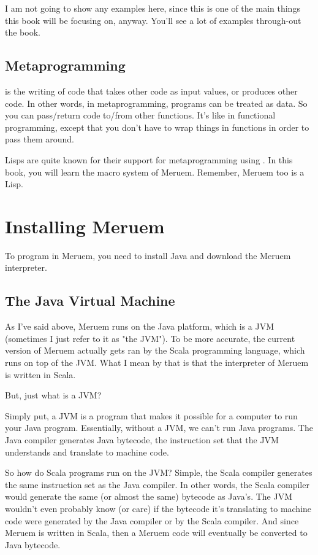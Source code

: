 I am not going to show any examples here, since this is one of the main things this book will be focusing on, anyway. You'll see a lot of examples through-out the book.

\subsection{Metaprogramming}
 is the writing of code that takes other code as input values, or produces other code. In other words, in metaprogramming, programs can be treated as data. So you can pass/return code to/from other functions. It's like in functional programming, except that you don't have to wrap things in functions in order to pass them around. 

Lisps are quite known for their support for metaprogramming using . In this book, you will learn the macro system of Meruem. Remember, Meruem too is a Lisp.  

\section{Installing Meruem}
\label{sec:installing-meruem}
To program in Meruem, you need to install Java and download the Meruem interpreter.

\subsection{The Java Virtual Machine}
As I've said above, Meruem runs on the Java platform, which is a JVM (sometimes I just refer to it as "the JVM"). To be more accurate, the current version of Meruem actually gets ran by the Scala programming language, which runs on top of the JVM. What I mean by that is that the interpreter of Meruem is written in Scala. 

But, just what is a JVM? 

Simply put, a JVM is a program that makes it possible for a computer to run your Java program. Essentially, without a JVM, we can't run Java programs. The Java compiler generates Java bytecode, the instruction set that the JVM understands and translate to machine code.

So how do Scala programs run on the JVM? Simple, the Scala compiler generates the same instruction set as the Java compiler. In other words, the Scala compiler would generate the same (or almost the same) bytecode as Java's. The JVM wouldn't even probably know (or care) if the bytecode it's translating to machine code were generated by the Java compiler or by the Scala compiler. And since Meruem is written in Scala, then a Meruem code will eventually be converted to Java bytecode. 

